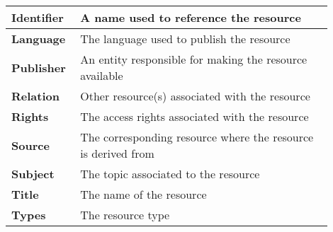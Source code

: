 \begin{longtable}{
>{\arraybackslash}p{0.16\linewidth}|
>{\arraybackslash}p{0.74\linewidth}}
 \cline{1-2}
 
 \textbf{Identifier} &
 {A name used to reference the resource} \\

 \cline{1-2}
 
 \textbf{Language} &
 {The language used to publish the resource} \\

 \cline{1-2}
 
 \textbf{Publisher} &
 {An entity responsible for making the resource available} \\

 \cline{1-2}

 \textbf{Relation} &
 {Other resource(s) associated with the resource} \\

 \cline{1-2}
 
 \textbf{Rights} &
 {The access rights associated with the resource} \\

 \cline{1-2}
 
 \textbf{Source} &
 {The corresponding resource where the resource is derived from} \\

 \cline{1-2}
 
 \textbf{Subject} &
 {The topic associated to the resource} \\

 \cline{1-2}
 
 \textbf{Title} &
 {The name of the resource} \\

 \cline{1-2}
 
 \textbf{Types} &
 {The resource type} \\
 
\end{longtable}
